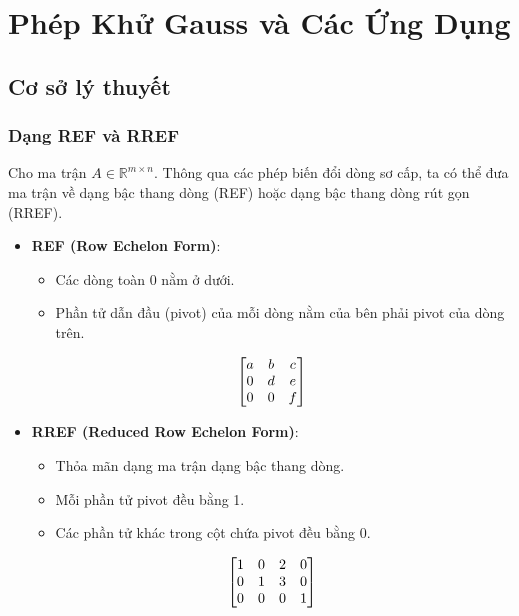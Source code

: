 \chapter{Phép Khử Gauss và Các Ứng Dụng}

\newpage

\section{Cơ sở lý thuyết}

\subsection{Dạng REF và RREF}

Cho ma trận $A \in \mathbb{R}^{m \times n}$. Thông qua các phép biến đổi dòng sơ cấp, ta có thể đưa ma trận về dạng bậc thang dòng (REF) hoặc dạng bậc thang dòng rút gọn (RREF).

\begin{itemize}[topsep=0pt, itemsep=2.5pt, leftmargin=1.5cm]
    \item \textbf{REF (Row Echelon Form)}:
    \begin{itemize}[label=, leftmargin=1.5cm]
        \item Các dòng toàn 0 nằm ở dưới.
        \item Phần tử dẫn đầu (pivot) của mỗi dòng nằm của bên phải pivot của dòng trên.
    \end{itemize}
    \[
        \scalebox{1.0}{
        $
        \begin{bmatrix}
            a & b & c \\
            0 & d & e \\
            0 & 0 & f
        \end{bmatrix}
        $
        }
    \]

    \item \textbf{RREF (Reduced Row Echelon Form)}:
    \begin{itemize}[label=, leftmargin=1.5cm]
        \item Thỏa mãn dạng ma trận dạng bậc thang dòng.
        \item Mỗi phần tử pivot đều bằng 1.
        \item Các phần tử khác trong cột chứa pivot đều bằng 0.
    \end{itemize}
    \[
        \scalebox{1.0}{
        $
        \begin{bmatrix}
            1 & 0 & 2 & 0 \\
            0 & 1 & 3 & 0 \\
            0 & 0 & 0 & 1
        \end{bmatrix}
        $
        }
    \]
\end{itemize}

